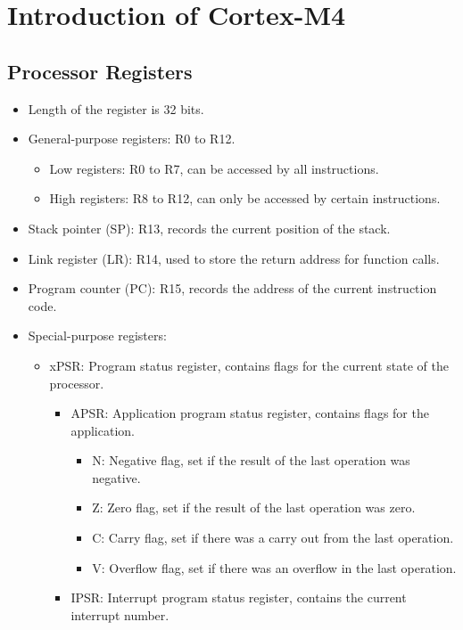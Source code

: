 \documentclass[a4paper,12pt,openany]{book}
\begin{document}
\chapter{Introduction of Cortex-M4}
\section{Processor Registers}
\begin{itemize}
    \item Length of the register is 32 bits.
    \item General-purpose registers: R0 to R12.
    \begin{itemize}
        \item Low registers: R0 to R7, can be accessed by all instructions.
        \item High registers: R8 to R12, can only be accessed by certain instructions.
    \end{itemize}
    \item Stack pointer (SP): R13, records the current position of the stack.
    \item Link register (LR): R14, used to store the return address for function calls.
    \item Program counter (PC): R15, records the address of the current instruction code.
    \item Special-purpose registers:
    \begin{itemize}
        \item xPSR: Program status register, contains flags for the current state of the processor.
        \begin{itemize}
            \item APSR: Application program status register, contains flags for the application.
            \begin{itemize}
                \item N: Negative flag, set if the result of the last operation was negative.
                \item Z: Zero flag, set if the result of the last operation was zero.
                \item C: Carry flag, set if there was a carry out from the last operation.
                \item V: Overflow flag, set if there was an overflow in the last operation.
            \end{itemize}
            \item IPSR: Interrupt program status register, contains the current interrupt number.

\end{itemize}
\end{itemize}
\end{itemize}
\end{document}
